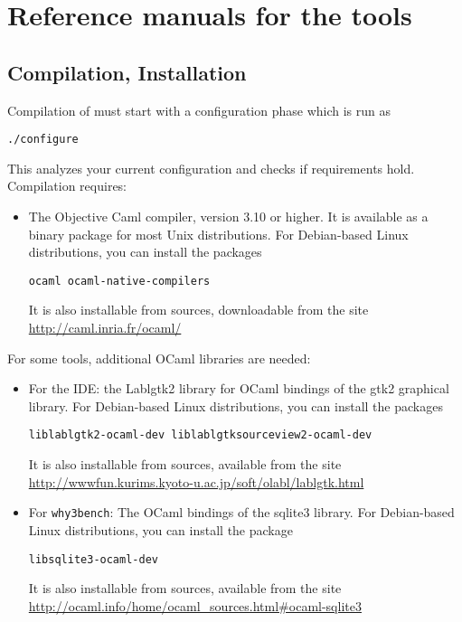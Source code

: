 \chapter{Reference manuals for the \why tools}
\label{chap:manpages}

\section{Compilation, Installation}
\label{sec:install}

Compilation of \why must start with a configuration phase which is run as
\begin{verbatim}
./configure
\end{verbatim}
This analyzes your current configuration and checks if requirements hold.
Compilation requires:
\begin{itemize}
\item The Objective Caml compiler, version 3.10 or higher. It is
  available as a binary package for most Unix distributions. For
  Debian-based Linux distributions, you can install the packages
\begin{verbatim}
ocaml ocaml-native-compilers
\end{verbatim}
It is also installable from sources, downloadable from the site
\url{http://caml.inria.fr/ocaml/}
\end{itemize}

\noindent
For some tools, additional OCaml libraries are needed:
\begin{itemize}
\item For the IDE: the Lablgtk2 library for OCaml bindings of the gtk2
  graphical library. For Debian-based Linux distributions, you can
  install the packages
\begin{verbatim}
liblablgtk2-ocaml-dev liblablgtksourceview2-ocaml-dev
\end{verbatim}
It is also installable from sources, available from the site
\url{http://wwwfun.kurims.kyoto-u.ac.jp/soft/olabl/lablgtk.html}

\item For \texttt{why3bench}: The OCaml bindings of the sqlite3 library.
For Debian-based Linux distributions, you can install the package
\begin{verbatim}
libsqlite3-ocaml-dev
\end{verbatim}
It is also installable from sources, available from the site
\url{http://ocaml.info/home/ocaml_sources.html#ocaml-sqlite3}
\end{itemize}

